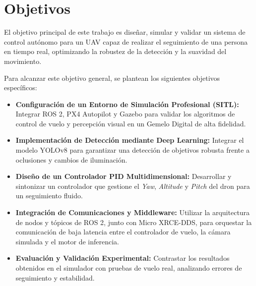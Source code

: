 \chapter{\label{objetivos}Objetivos}

El objetivo principal de este trabajo es diseñar, simular y validar un sistema de control autónomo para un UAV capaz de realizar el seguimiento de una persona en tiempo real, optimizando la robustez de la detección y la suavidad del movimiento.

Para alcanzar este objetivo general, se plantean los siguientes objetivos específicos:

\begin{itemize}
    \item \textbf{Configuración de un Entorno de Simulación Profesional (SITL):} Integrar ROS 2, PX4 Autopilot y Gazebo para validar los algoritmos de control de vuelo y percepción visual en un Gemelo Digital de alta fidelidad.
    \item \textbf{Implementación de Detección mediante Deep Learning:} Integrar el modelo YOLOv8 para garantizar una detección de objetivos robusta frente a oclusiones y cambios de iluminación.
    \item \textbf{Diseño de un Controlador PID Multidimensional:} Desarrollar y sintonizar un controlador que gestione el \textit{Yaw}, \textit{Altitude} y \textit{Pitch} del dron para un seguimiento fluido.
    \item \textbf{Integración de Comunicaciones y Middleware:} Utilizar la arquitectura de nodos y tópicos de ROS 2, junto con Micro XRCE-DDS, para orquestar la comunicación de baja latencia entre el controlador de vuelo, la cámara simulada y el motor de inferencia.
    \item \textbf{Evaluación y Validación Experimental:} Contrastar los resultados obtenidos en el simulador con pruebas de vuelo real, analizando errores de seguimiento y estabilidad.
\end{itemize}
